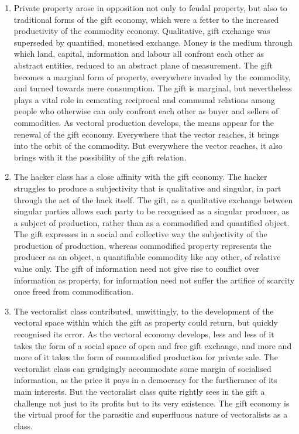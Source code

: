 \documentclass[letterpaper,12pt,english]{sphinxmanual}
\begin{document}
\begin{enumerate}
\item {} 
Private property arose in opposition not only to feudal property, but also to traditional forms of the gift economy, which were a fetter to the increased productivity of the commodity economy. Qualitative, gift exchange was superseded by quantified, monetised exchange. Money is the medium through which land, capital, information and labour all confront each other as abstract entities, reduced to an abstract plane of measurement. The gift becomes a marginal form of property, everywhere invaded by the commodity, and turned towards mere consumption. The gift is marginal, but nevertheless plays a vital role in cementing reciprocal and communal relations among people who otherwise can only confront each other as buyer and sellers of commodities. As vectoral production develops, the means appear for the renewal of the gift economy. Everywhere that the vector reaches, it brings into the orbit of the commodity. But everywhere the vector reaches, it also brings with it the possibility of the gift relation.

\item {} 
The hacker class has a close affinity with the gift economy. The hacker struggles to produce a subjectivity that is qualitative and singular, in part through the act of the hack itself. The gift, as a qualitative exchange between singular parties allows each party to be recognised as a singular producer, as a subject of production, rather than as a commodified and quantified object. The gift expresses in a social and collective way the subjectivity of the production of production, whereas commodified property represents the producer as an object, a quantifiable commodity like any other, of relative value only. The gift of information need not give rise to conflict over information as property, for information need not suffer the artifice of scarcity once freed from commodification.

\item {} 
The vectoralist class contributed, unwittingly, to the development of the vectoral space within which the gift as property could return, but quickly recognised its error. As the vectoral economy develops, less and less of it takes the form of a social space of open and free gift exchange, and more and more of it takes the form of commodified production for private sale. The vectoralist class can grudgingly accommodate some margin of socialised information, as the price it pays in a democracy for the furtherance of its main interests. But the vectoralist class quite rightly sees in the gift a challenge not just to its profits but to its very existence. The gift economy is the virtual proof for the parasitic and superfluous nature of vectoralists as a class.

\end{enumerate}
\end{document}
